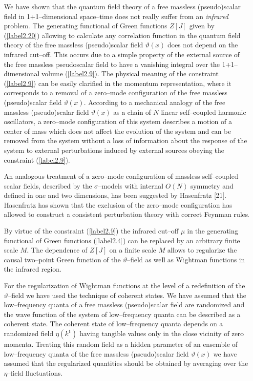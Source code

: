 \documentclass[a4paper,12pt] {article}
\begin{document}
\hspace{0.2in} We have shown that the quantum field theory of a free
massless (pseudo)scalar field in 1+1--dimensional space--time does not
really suffer from an {\it infrared} problem. The generating
functional of Green functions $Z[J]$ given by (\ref{label2.20})
allowing to calculate any correlation function in the quantum field
theory of the free massless (pseudo)scalar field $\vartheta(x)$ does
not depend on the infrared cut--off. This occurs due to a simple
property of the external source of the free massless pseudoscalar
field to have a vanishing integral over the 1+1--dimensional volume
(\ref{label2.9}). The physical meaning of the constraint
(\ref{label2.9}) can be easily clarified in the momentum
representation, where it corresponds to a removal of a zero--mode
configuration of the free massless (pseudo)scalar field
$\vartheta(x)$.  According to a mechanical analogy of the free
massless (pseudo)scalar field $\vartheta(x)$ as a chain of $N$ linear
self--coupled harmonic oscillators, a zero--mode configuration of this
system describes a motion of a center of mass which does not affect
the evolution of the system and can be removed from the system without
a loss of information about the response of the system to external
perturbations induced by external sources obeying the constraint
(\ref{label2.9}).

An analogous treatment of a zero--mode configuration of massless
 self--coupled scalar fields, described by the $\sigma$--models with
 internal $O(N)$ symmetry and defined in one and two dimensions, has
 been suggested by Hasenfratz [21]. Hasenfratz has shown that the
 exclusion of the zero--mode configuration has allowed to construct a
 consistent perturbation theory with correct Feynman rules.

By virtue of the constraint (\ref{label2.9}) the infrared cut--off
$\mu$ in the generating functional of Green functions (\ref{label2.4})
can be replaced by an arbitrary finite scale $M$. The dependence of
$Z[J]$ on a finite scale $M$ allows to regularize the causal
two--point Green function of the $\vartheta$--field as well as
Wightman functions in the infrared region.

For the regularization of Wightman functions at the level of a
redefinition of the $\vartheta$--field we have used the technique of
coherent states. We have assumed that the low--frequency quanta of a
free massless (pseudo)scalar field are randomized and the wave
function of the system of low--frequency quanta can be described as a
coherent state. The coherent state of low--frequency quanta depends on
a randomized field $\eta(k^1)$ having tangible values only in the
close vicinity of zero momenta.  Treating this random field as a
hidden parameter of an ensemble of low--frequency quanta of the free
massless (pseudo)scalar field $\vartheta(x)$ we have assumed that the
regularized quantities should be obtained by averaging over the
$\eta$--field fluctuations.
\end{document}
